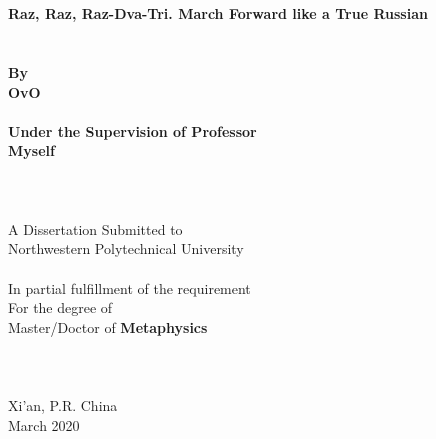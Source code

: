 \begin{titlepage}
	\fTNR
	\begin{spacing}{1.2}
		\begin{center}
			\renewcommand{\baselinestretch}{1.2}
			\renewcommand{\captionfont}{\linespread{1.2}\normalsize}
			\setmainfont{\defaultEngFont}
			\sSanhao ~ \\
			\sSanhao ~ \\
			\fTNR \sErhao  \textbf{Raz, Raz, Raz-Dva-Tri. March Forward like a True Russian}
			\fSong \sXiaoer ~ \\
			\fSong \sXiaoer ~ \\
			\fSong \sXiaoer ~ \\
			\fTNR \sXiaosan \textbf{By}\\
			\fTNR \sXiaosan \textbf{OvO}\\
			\fSong \sXiaosan ~ \\
			\fTNR \sXiaosan \textbf{Under the Supervision of Professor}\\
			\fTNR \sXiaosan \textbf{Myself}
			\fSong \sSanhao ~ \\
			\fSong \sSanhao ~ \\
			\fSong \sSanhao ~ \\
			\fSong \sSanhao ~ \\
			\fTNR \sXiaosan A Dissertation Submitted to\\
			\fTNR \sXiaosan Northwestern Polytechnical University \\
			\fSong \sSanhao ~ \\
			\fTNR In partial fulfillment of the requirement \\
			\fTNR For the degree of \\
			\fTNR Master/Doctor of \textbf{Metaphysics}
			\fSong \sXiaosan ~\\
			\fSong \sXiaosan ~\\
			\fSong \sXiaosan ~\\
			\fSong \sXiaosan ~\\
			\fTNR \sXiaosan Xi'an, P.R. China \\
			\fTNR \sXiaosan March 2020
		\end{center}
	\end{spacing}

\end{titlepage}
\fSong \normalsize

\endinput